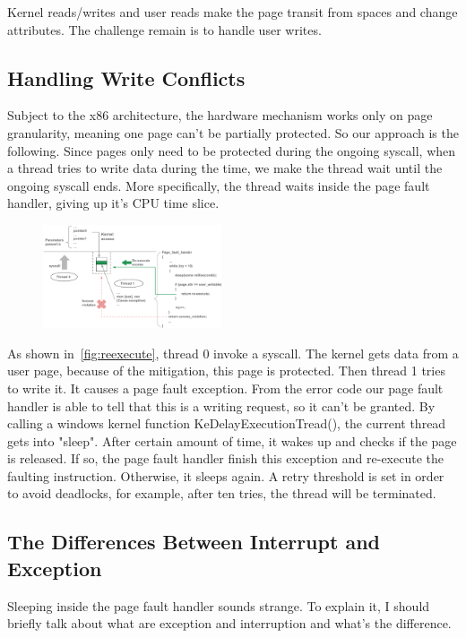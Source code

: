 Kernel reads/writes and user reads make the page transit from spaces and change attributes. The challenge remain is to handle user writes. 


\subsection{Handling Write Conflicts}
Subject to the x86 architecture, the hardware mechanism works only on page granularity, meaning one page can't be partially protected. So our approach is the following. Since pages only need to be protected during the ongoing syscall, when a thread tries to write data during the time, we make the thread wait until the ongoing syscall ends. More specifically, the thread waits inside the page fault handler, giving up it's CPU time slice. 

\begin{figure}[th]
  \includegraphics[width=0.47\textwidth]{figures/reexecute}
  \centering
  \caption{}
  \label{fig:reexecute}
\end{figure}


As shown in~\autoref{fig:reexecute}, thread 0 invoke a syscall. The kernel gets data from a user page, because of the mitigation, this page is protected. Then thread 1 tries to write it. It causes a page fault exception. From the error code our page fault handler is able to tell that this is a writing request, so it can't be granted. By calling a windows kernel function KeDelayExecutionTread(), the current thread gets into "sleep". After certain amount of time, it wakes up and checks if the page is released. If so, the page fault handler finish this exception and re-execute the faulting instruction. Otherwise, it sleeps again. A retry threshold is set in order to avoid deadlocks, for example, after ten tries, the thread will be terminated.  

\subsection{The Differences Between Interrupt and Exception}

Sleeping inside the page fault handler sounds strange. To explain it, I should briefly talk about what are exception and interruption and what's the difference.

